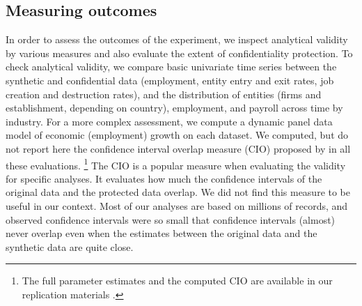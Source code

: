 \subsection{Measuring outcomes}

In order to assess the outcomes of the experiment, we inspect analytical validity by various measures and also evaluate the extent of confidentiality protection. To check analytical validity, we compare basic univariate time series between the synthetic and confidential data (employment, entity entry and exit rates, job creation and destruction rates), and the distribution of entities (firms and establishment, depending on country),  employment, and payroll across time by industry. For a more complex assessment, we compute a dynamic panel data model of economic (employment) growth on each dataset. 
We computed, but do not report here the confidence interval overlap measure (CIO) proposed by \citet{tas2006} in all these evaluations.%
\footnote{The full parameter estimates and the computed CIO are available in our replication materials \parencite{SIT-paper-repo}.}
The CIO is a popular measure when evaluating the validity for specific analyses. It evaluates how much the confidence intervals of the original data and the protected data overlap. We did not find this measure to be useful in our context. Most of our analyses are based on millions of records, and observed confidence intervals were so small that confidence intervals (almost) never overlap even when the estimates between the original data and the synthetic data are quite close. 
%

